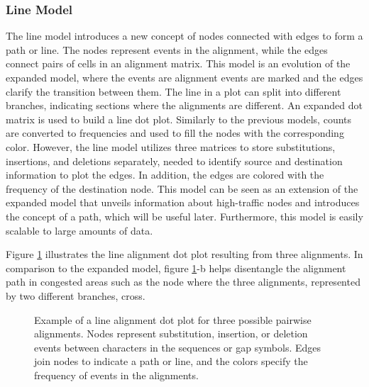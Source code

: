 \subsubsection{Line Model}

The line model introduces a new concept of nodes connected with edges to form a path or line.
The nodes represent events in the alignment, while the edges connect pairs of cells in an alignment matrix. This model is an evolution of the expanded model, where the events are alignment events are marked and the edges clarify the transition between them. The line in a plot can split into different branches, indicating sections where the alignments are different. An expanded dot matrix is used to build a line dot plot. Similarly to the previous models, counts are converted to frequencies and used to fill the nodes with the corresponding color. However, the line model utilizes three matrices to store substitutions, insertions, and deletions separately, needed to identify source and destination information to plot the edges. In addition, the edges are colored with the frequency of the destination node. This model can be seen as an extension of the expanded model that unveils information about high-traffic nodes and introduces the concept of a path, which will be useful later. Furthermore, this model is easily scalable to large amounts of data.

Figure \ref{fig:line} illustrates the line alignment dot plot resulting from three alignments. In comparison to the expanded model, figure \ref{fig:line}-b helps disentangle the alignment path in congested areas such as the node where the three alignments, represented by two different branches, cross.

\clearpage

\begin{figure}[!htb]
    \centering
    \begin{subfigure}[c]{0.2\textwidth}
        \centering
        \vspace*{4em}\hspace*{-4em}\scalebox{0.8}{}
        \vspace*{1em}\caption{}
     \end{subfigure}
     \hspace{3.2em}
    \begin{subfigure}[c]{0.5\textwidth}
        \centering
        \resizebox{1.3\textwidth}{!}{}
        \caption{}
     \end{subfigure}
    \caption[Line Dot Plot Model]{Example of a line alignment dot plot for three possible pairwise alignments. Nodes represent substitution, insertion, or deletion events between characters in the sequences or gap symbols. Edges join nodes to indicate a path or line, and the colors specify the frequency of events in the alignments.}
    \label{fig:line}
\end{figure}

